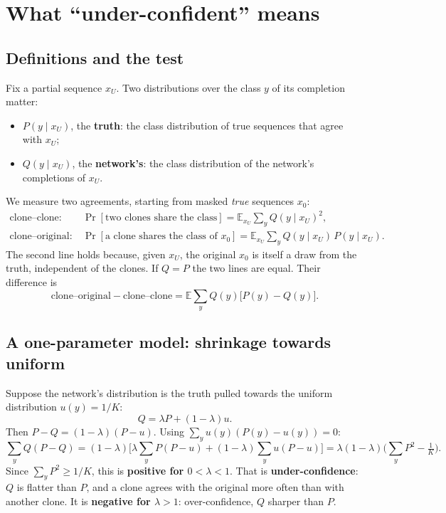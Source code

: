 \documentclass[11pt,a4paper]{article}
\newcommand{\E}{\mathbb{E}}
\begin{document}
\section{What ``under-confident'' means}
\subsection{Definitions and the test}
Fix a partial sequence $x_U$. Two distributions over the class $y$ of its completion matter:
\begin{itemize}[nosep]
\item $P(y\mid x_U)$, the \textbf{truth}: the class distribution of true sequences that agree with $x_U$;
\item $Q(y\mid x_U)$, the \textbf{network's}: the class distribution of the network's completions of $x_U$.
\end{itemize}
We measure two agreements, starting from masked \emph{true} sequences $x_0$:
\begin{align*}
\text{clone--clone:}\quad&\Pr[\text{two clones share the class}]=\E_{x_U}\sum_yQ(y\mid x_U)^2 ,\\
\text{clone--original:}\quad&\Pr[\text{a clone shares the class of }x_0]=\E_{x_U}\sum_yQ(y\mid x_U)\,P(y\mid x_U) .
\end{align*}
The second line holds because, given $x_U$, the original $x_0$ is itself a draw from the truth, independent of the
clones. If $Q=P$ the two lines are equal. Their difference is
\[
\text{clone--original}-\text{clone--clone}=\E\sum_yQ(y)\big[P(y)-Q(y)\big].
\]

\subsection{A one-parameter model: shrinkage towards uniform}
Suppose the network's distribution is the truth pulled towards the uniform distribution $u(y)=1/K$:
\[
Q=\lambda P+(1-\lambda)u .
\]
Then $P-Q=(1-\lambda)(P-u)$. Using $\sum_yu(y)(P(y)-u(y))=0$:
\[
\sum_yQ(P-Q)=(1-\lambda)\Big[\lambda\sum_yP(P-u)+(1-\lambda)\sum_yu(P-u)\Big]=\lambda(1-\lambda)\Big(\sum_yP^2-\tfrac1K\Big).
\]
Since $\sum_yP^2\ge1/K$, this is \textbf{positive for $0<\lambda<1$}. That is \textbf{under-confidence}: $Q$ is flatter
than $P$, and a clone agrees with the original more often than with another clone. It is \textbf{negative for
$\lambda>1$}: over-confidence, $Q$ sharper than $P$.
\end{document}
